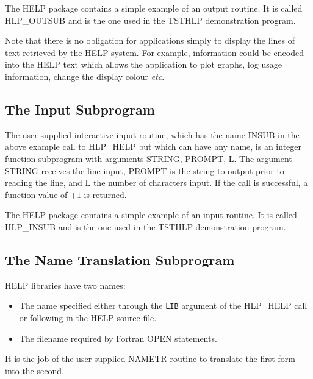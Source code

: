 The HELP package contains a simple example of an output routine.  It
is called HLP\_OUTSUB and is the one used in the TSTHLP demonstration
program.

Note that there is no obligation for applications simply to display
the lines of text retrieved by the HELP system.  For example,
information could be encoded into the HELP text which allows the
application to plot graphs, log usage information, change the
display colour {\it etc}.

\subsection{The Input Subprogram}
The user-supplied interactive input routine, which has the name INSUB
in the above
example call to HLP\_HELP but which can have any name, is an
integer function subprogram with arguments STRING, PROMPT, L.
The argument STRING
receives the line input, PROMPT is the string to output prior to
reading the line, and L the number of characters input.  If the
call is successful, a function value of $+1$ is returned.

The HELP package contains a simple example of an input routine.  It
is called HLP\_INSUB and is the one used in the TSTHLP demonstration
program.

\subsection{The Name Translation Subprogram}
HELP libraries have two names:
\begin{itemize}
\item The name specified either through the \verb|LIB| argument of the
HLP\_HELP call or following  in the HELP source file.
\item The filename required by Fortran OPEN statements.
\end{itemize}
It is the job of the user-supplied
NAMETR routine to translate the first form into the second.

